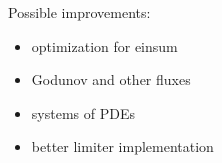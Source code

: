 

Possible improvements:
\begin{itemize}
	\item optimization for einsum
	\item Godunov and other fluxes
	\item systems of PDEs
	\item better limiter implementation
\end{itemize}

